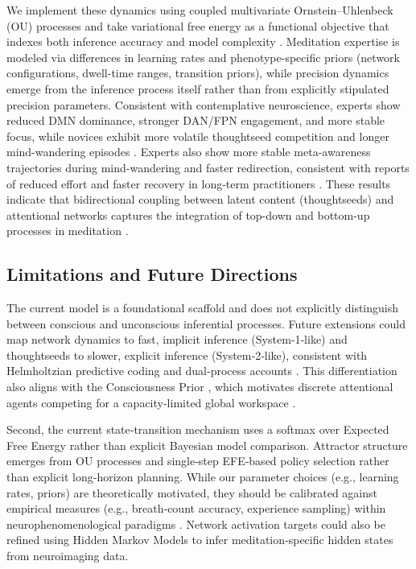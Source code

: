 \documentclass[openacc]{rsproca_new}%
\begin{document}
We implement these dynamics using coupled multivariate Ornstein–Uhlenbeck (OU) processes \cite{Gilson2016} and take variational free energy as a functional objective that indexes both inference accuracy and model complexity \cite{ParrPezzuloFriston2022,SandvedSmith2025}. Meditation expertise is modeled via differences in learning rates and phenotype-specific priors (network configurations, dwell-time ranges, transition priors), while precision dynamics emerge from the inference process itself rather than from explicitly stipulated precision parameters. Consistent with contemplative neuroscience, experts show reduced DMN dominance, stronger DAN/FPN engagement, and more stable focus, while novices exhibit more volatile thoughtseed competition and longer mind-wandering episodes \cite{Brewer2011,Seeley2007,Hasenkamp2012}. Experts also show more stable meta-awareness trajectories during mind-wandering and faster redirection, consistent with reports of reduced effort and faster recovery in long-term practitioners \cite{Dahl2015,Fox2015,Tang2015}. These results indicate that bidirectional coupling between latent content (thoughtseeds) and attentional networks captures the integration of top-down and bottom-up processes in meditation \cite{LaukkonenSlagter2021,RaffoneSrinivasan2017}.

\subsection{Limitations and Future Directions}
The current model is a foundational scaffold and does not explicitly distinguish between conscious and unconscious inferential processes. Future extensions could map network dynamics to fast, implicit inference (System‑1‑like) and thoughtseeds to slower, explicit inference (System‑2‑like), consistent with Helmholtzian predictive coding \cite{Clark2013,Hohwy2013,ParrPezzuloFriston2022} and dual‑process accounts \cite{Kahneman2011}. This differentiation also aligns with the Consciousness Prior \cite{Bengio2017}, which motivates discrete attentional agents competing for a capacity‑limited global workspace \cite{Mashour2020,Miller1956}.

Second, the current state‑transition mechanism uses a softmax over Expected Free Energy rather than explicit Bayesian model comparison. Attractor structure emerges from OU processes and single‑step EFE‑based policy selection rather than explicit long‑horizon planning. While our parameter choices (e.g., learning rates, priors) are theoretically motivated, they should be calibrated against empirical measures (e.g., breath‑count accuracy, experience sampling) within neurophenomenological paradigms \cite{Varela2017,Lutz2024}. Network activation targets could also be refined using Hidden Markov Models to infer meditation‑specific hidden states from neuroimaging data.
\end{document}
